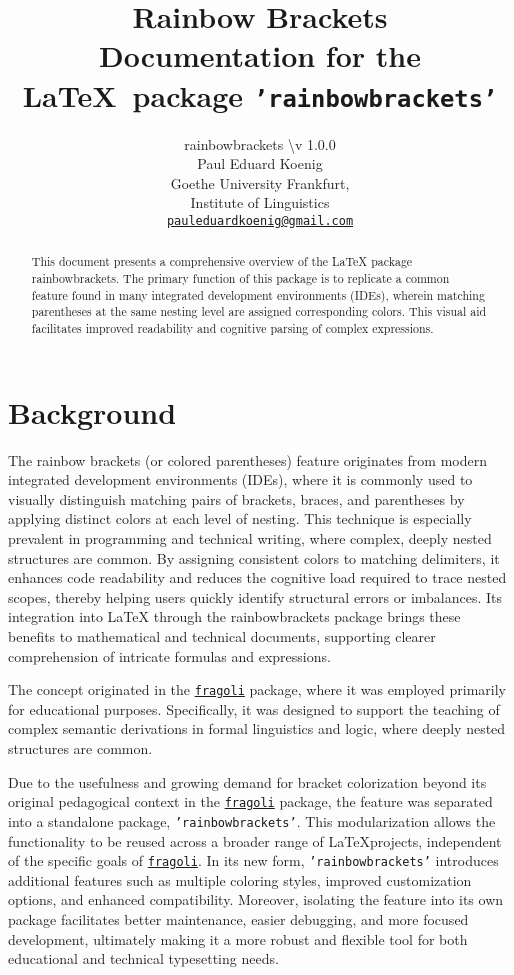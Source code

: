 \documentclass[10pt, a4paper]{article}
\title{Rainbow Brackets\\Documentation for the \LaTeX\ package \texttt{'rainbowbrackets'}}
\author{rainbowbrackets \textbackslash v 1.0.0\\Paul Eduard Koenig\\Goethe University Frankfurt,\\Institute of Linguistics\\\texttt{\href{mailto:pauleduardkoenig@gmail.com}{pauleduardkoenig@gmail.com}}}
\begin{document}
	\maketitle
	\begin{abstract}
		\noindent This document presents a comprehensive overview of the LaTeX package rainbowbrackets. The primary function of this package is to replicate a common feature found in many integrated development environments (IDEs), wherein matching parentheses at the same nesting level are assigned corresponding colors. This visual aid facilitates improved readability and cognitive parsing of complex expressions.
	\end{abstract}
	\tableofcontents
	\section{Background}
	The rainbow brackets (or colored parentheses) feature originates from modern integrated development environments (IDEs), where it is commonly used to visually distinguish matching pairs of brackets, braces, and parentheses by applying distinct colors at each level of nesting. This technique is especially prevalent in programming and technical writing, where complex, deeply nested structures are common. By assigning consistent colors to matching delimiters, it enhances code readability and reduces the cognitive load required to trace nested scopes, thereby helping users quickly identify structural errors or imbalances. Its integration into LaTeX through the rainbowbrackets package brings these benefits to mathematical and technical documents, supporting clearer comprehension of intricate formulas and expressions.
	
	The concept originated in the \texttt{\href{https://ctan.org/pkg/fragoli}{fragoli}} package, where it was employed primarily for educational purposes. Specifically, it was designed to support the teaching of complex semantic derivations in formal linguistics and logic, where deeply nested structures are common. 
	
	Due to the usefulness and growing demand for bracket colorization beyond its original pedagogical context in the \texttt{\href{https://ctan.org/pkg/fragoli}{fragoli}} package, the feature was separated into a standalone package, \texttt{'rainbowbrackets'}. This modularization allows the functionality to be reused across a broader range of \LaTeX projects, independent of the specific goals of \texttt{\href{https://ctan.org/pkg/fragoli}{fragoli}}. In its new form, \texttt{'rainbowbrackets'} introduces additional features such as multiple coloring styles, improved customization options, and enhanced compatibility. Moreover, isolating the feature into its own package facilitates better maintenance, easier debugging, and more focused development, ultimately making it a more robust and flexible tool for both educational and technical typesetting needs.
	
\end{document}
